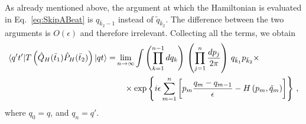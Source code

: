 As already mentioned above, the argument at which the Hamiltonian is evaluated in 
Eq.~\eqref{eq:SkipABeat} is $q_{\bar k_2-1}$ instead of $\tilde{q}_{\bar k_2}$. The 
difference between the two arguments is $O(\epsilon)$ and therefore irrelevant. 
Collecting all the terms, we obtain
\begin{align}
  \langle q't' | T\left(\hat{Q}_H(\bar{t}_1) \hat{P}_H(\bar{t}_2)\right) | qt \rangle =& \lim_{n\to\infty} \int 
  \left(\prod_{k=1}^{n-1}dq_k\right)\, 
  \left(\prod_{j=1}^{n} \frac{dp_j}{2\pi}\right)\, q_{\bar k_1} p_{\bar k_2} \times \nonumber\\
  \label{eq:DiscretePhaseSpaceIntegralMixedCorr}
  &\quad \times \exp \left\{
    i\epsilon \sum_{m=1}^{n} \left[
    p_m \frac{q_m-q_{m-1}}{\epsilon} - H\left(p_m, 
    \tilde{q}_m \right)
    \right]
    \right\}\, ,
\end{align}
where $q_0 = q$, and $q_n = q'$.


